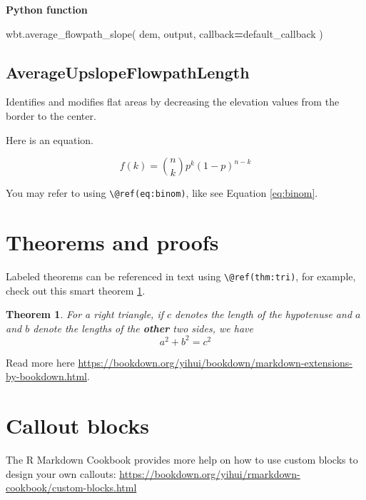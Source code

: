 \documentclass[
]{book}
\newenvironment{Shaded}{\begin{snugshade}}{\end{snugshade}}
\newcommand{\NormalTok}[1]{#1}
\newcommand{\OperatorTok}[1]{\textcolor[rgb]{0.81,0.36,0.00}{\textbf{#1}}}
\newtheorem{theorem}{Theorem}[chapter]
\theoremstyle{definition}
\theoremstyle{definition}
\theoremstyle{definition}
\theoremstyle{definition}
\theoremstyle{remark}
\begin{document}
\textbf{Python function}

\begin{Shaded}
\begin{Highlighting}[]
\NormalTok{wbt.average\_flowpath\_slope(}
\NormalTok{    dem,}
\NormalTok{    output,}
\NormalTok{    callback}\OperatorTok{=}\NormalTok{default\_callback}
\NormalTok{)}
\end{Highlighting}
\end{Shaded}

\subsection{AverageUpslopeFlowpathLength}\label{AverageUpslopeFlowpathLength}

Identifies and modifies flat areas by decreasing the elevation values from the border to the center.

Here is an equation.

\begin{equation} 
  f\left(k\right) = \binom{n}{k} p^k\left(1-p\right)^{n-k}
  \label{eq:binom}
\end{equation}

You may refer to using \texttt{\textbackslash{}@ref(eq:binom)}, like see Equation \eqref{eq:binom}.

\section{Theorems and proofs}\label{theorems-and-proofs}

Labeled theorems can be referenced in text using \texttt{\textbackslash{}@ref(thm:tri)}, for example, check out this smart theorem \ref{thm:tri}.

\begin{theorem}
\protect\hypertarget{thm:tri}{}\label{thm:tri}For a right triangle, if \(c\) denotes the \emph{length} of the hypotenuse
and \(a\) and \(b\) denote the lengths of the \textbf{other} two sides, we have
\[a^2 + b^2 = c^2\]
\end{theorem}

Read more here \url{https://bookdown.org/yihui/bookdown/markdown-extensions-by-bookdown.html}.

\section{Callout blocks}\label{callout-blocks}

The R Markdown Cookbook provides more help on how to use custom blocks to design your own callouts: \url{https://bookdown.org/yihui/rmarkdown-cookbook/custom-blocks.html}
\end{document}
